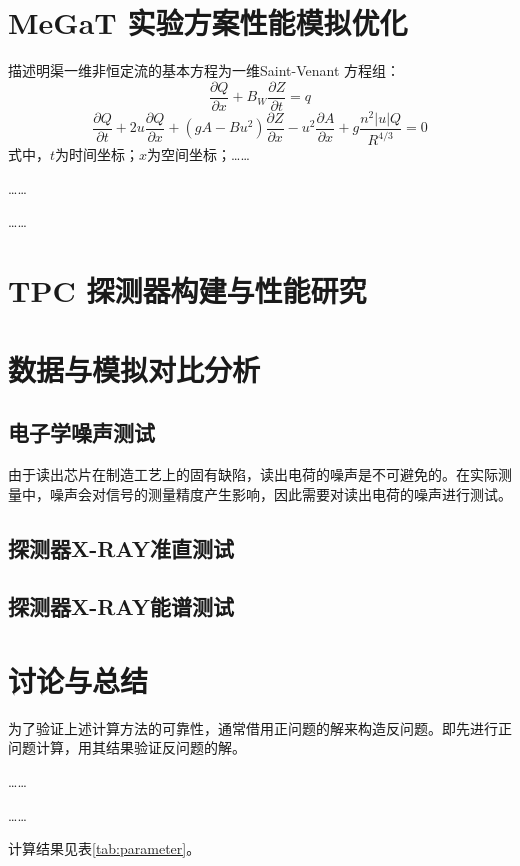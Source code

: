 \section{MeGaT 实验方案性能模拟优化}


描述明渠一维非恒定流的基本方程为一维Saint-Venant 方程组：
\begin{equation}
	\frac{\partial Q}{\partial x}+B_{W}\frac{\partial Z}{\partial t}=q
\end{equation}
\begin{equation}
	\frac{\partial Q}{\partial t}+2u\frac{\partial Q}{\partial x}+(gA-Bu^{2})\frac{\partial Z}{\partial x}-u^{2}\frac{\partial A}{\partial x}+g\frac{n^{2} |u|Q}{R^{4/3}}=0
\end{equation}
\noindent 式中，$t$为时间坐标；$x$为空间坐标；……\par
……\par
……

\section{ TPC 探测器构建与性能研究}


\section{数据与模拟对比分析}
\subsection{电子学噪声测试}
由于读出芯片在制造工艺上的固有缺陷，读出电荷的噪声是不可避免的。在实际测量中，噪声会对信号的测量精度产生影响，因此需要对读出电荷的噪声进行测试。\par


\subsection{探测器X-RAY准直测试}


\subsection{探测器X-RAY能谱测试}


\subsection{}



\section{讨论与总结}
为了验证上述计算方法的可靠性，通常借用正问题的解来构造反问题。即先进行正问题计算，用其结果验证反问题的解。\par
……\par
……\par
计算结果见表\ref{tab:parameter}。

